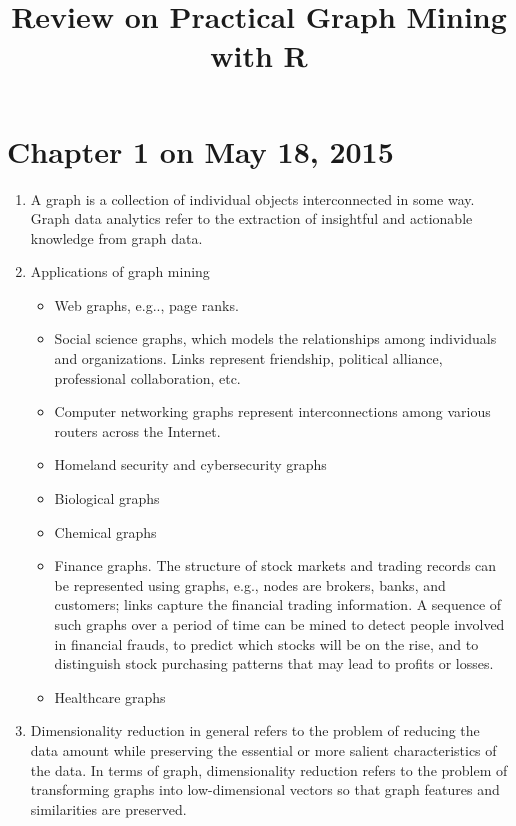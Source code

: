 \documentclass[14pt]{article}
\begin{document}
\title{Review on Practical Graph Mining with R}
\maketitle

\section{Chapter 1 on May 18, 2015}
\begin{enumerate}
 \item A graph is a collection of individual objects interconnected in some way. Graph data analytics refer to the extraction of insightful and actionable knowledge from graph data.
 
 \item Applications of graph mining 
  \begin{itemize}
   \item Web graphs, e.g.., page ranks.
   \item Social science graphs, which models the relationships among individuals and organizations. Links represent friendship, political alliance, professional collaboration, etc.
   \item Computer networking graphs represent interconnections among various routers across the Internet. 
   \item Homeland security and cybersecurity graphs
   \item Biological graphs
   \item Chemical graphs
   \item Finance graphs. The structure of stock markets and trading records can be represented using graphs, e.g., nodes are brokers, banks, and customers; links capture the financial trading information. A sequence of such graphs over a period of time can be mined to detect people involved in financial frauds, to predict which stocks will be on the rise, and to distinguish stock purchasing patterns that may lead to profits or losses.
   \item Healthcare graphs
  \end{itemize}
  
  \item Dimensionality reduction in general refers to the problem of reducing the data amount while preserving the essential or more salient characteristics of the data. In terms of graph, dimensionality reduction refers to the problem of transforming graphs into low-dimensional vectors so that graph features and similarities are preserved. 
\end{enumerate}
\end{document}
